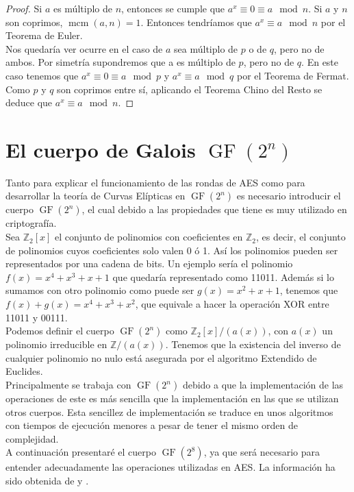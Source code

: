	\begin{proof}
		Si $a$ es múltiplo de $n$, entonces se cumple que $a^x \equiv 0 \equiv a \mod n$. Si $a$ y $n$ son coprimos, $\operatorname{mcm}(a,n) = 1$. Entonces tendríamos que $a^x \equiv a \mod n$ por el Teorema de Euler.\\
		Nos quedaría ver ocurre en el caso de $a$ sea múltiplo de $p$ o de $q$, pero no de ambos. Por simetría supondremos que a es múltiplo de $p$, pero no de $q$. En este caso tenemos que $a^x \equiv 0 \equiv a \mod p$  y $a^x \equiv a \mod q$ por el Teorema de Fermat. Como $p$ y $q$ son coprimos entre sí, aplicando el Teorema Chino del Resto se deduce que $a^x \equiv a \mod n$.\qedhere
	\end{proof}

\section{El cuerpo de Galois $\operatorname{GF}(2^n)$}
Tanto para explicar el funcionamiento de las rondas de AES como para desarrollar la teoría de Curvas Elípticas en $\operatorname{GF}(2^n)$ es necesario introducir el cuerpo $\operatorname{GF}(2^n)$, el cual debido a las propiedades que tiene es muy utilizado en criptografía.\\
Sea $\mathbb{Z}_2[x]$ el conjunto de polinomios con coeficientes en $\mathbb{Z}_2$, es decir, el conjunto de polinomios cuyos coeficientes solo valen 0 ó 1. Así los polinomios pueden ser representados por una cadena de bits.
 Un ejemplo sería el polinomio $f(x)=x^4+x^3+x+1$ que quedaría representado como 11011. 
Además si lo sumamos con otro polinomio como puede ser $g(x)=x^2+x+1$, tenemos que $f(x)+g(x)=x^4+x^3+x^2$, que equivale a hacer la operación XOR entre 11011 y 00111.\\
Podemos definir el cuerpo $\operatorname{GF}(2^n)$ como $\mathbb{Z}_2[x]/(a(x))$, con $a(x)$ un polinomio irreducible en $\mathbb{Z}/(a(x))$. Tenemos que la existencia del inverso de cualquier polinomio no nulo está asegurada por el algoritmo Extendido de Euclides.\\ 
Principalmente se trabaja con $\operatorname{GF}(2^n)$ debido a que la implementación de las operaciones de este es más sencilla que la implementación en las que se utilizan otros cuerpos. Esta sencillez de implementación se traduce en unos algoritmos con tiempos de ejecución menores a pesar de tener el mismo orden de complejidad.\\
A continuación presentaré el cuerpo $\operatorname{GF}(2^8)$, ya que será necesario para entender adecuadamente las operaciones utilizadas en AES. La información ha sido obtenida de \cite{criptografia} y \cite{dem1}.\\
